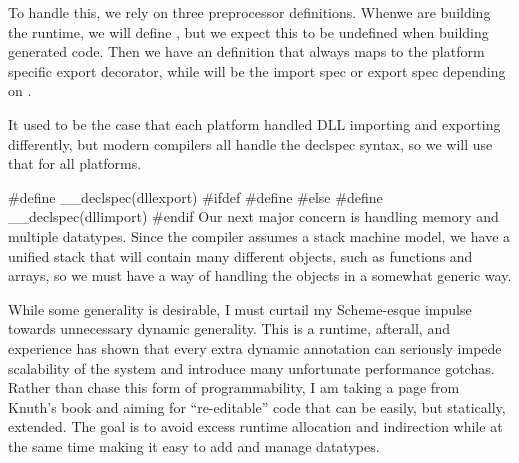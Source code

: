 \documentclass{article}%
\begin{document}
To handle this, we rely on three preprocessor definitions.
Whenwe are building the runtime,
we will define {\Tt{}\nwendquote},
but we expect this to be undefined when building generated code.
Then we have an {\Tt{}\nwendquote} definition
that always maps to the platform specific export decorator,
while {\Tt{}\nwendquote} will be the import spec or export spec
depending on {\Tt{}\nwendquote}.

It used to be the case
that each platform handled DLL importing and exporting differently,
but modern compilers all handle the {\Tt{}{\_}{\_}declspec\nwendquote} syntax,
so we will use that for all platforms.

\nwenddocs{}\endmoddef\nwstartdeflinemarkup{}\nwenddeflinemarkup
#define  __declspec(dllexport)
#ifdef 
        #define  
#else
        #define  __declspec(dllimport)
#endif
\eatline
{}\nwendcode{}\nwdocspar
Our next major concern is handling memory and multiple datatypes.
Since the compiler assumes a stack machine model,
we have a unified stack that will contain many different objects,
such as functions and arrays,
so we must have a way of handling the objects
in a somewhat generic way.

While some generality is desirable,
I must curtail my Scheme-esque impulse
towards unnecessary dynamic generality.
This is a runtime, afterall, and experience has shown that every extra
dynamic annotation can seriously impede scalability
of the system and introduce many unfortunate performance gotchas.
Rather than chase this form of programmability,
I am taking a page from Knuth's book
and aiming for ``re-editable'' code 
that can be easily, but statically, extended.
The goal is to avoid excess runtime allocation and indirection
while at the same time making it easy to add and manage datatypes.
\end{document}
